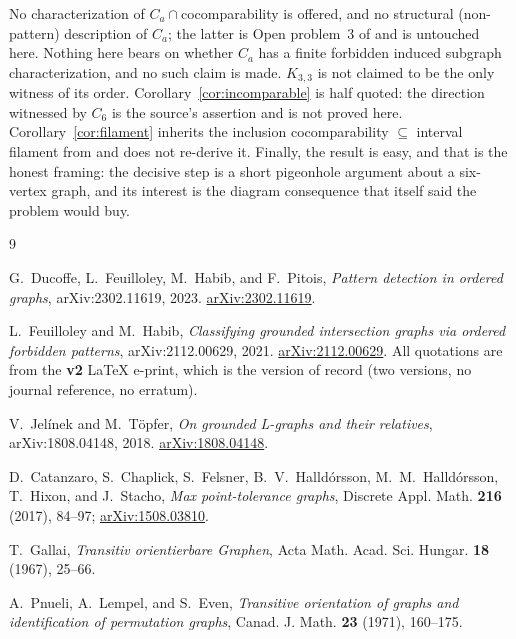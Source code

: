 \documentclass[11pt]{amsart}
\theoremstyle{remark}
\newcommand{\Ca}{C_a}
\begin{document}
No characterization of $\Ca\cap{}$cocomparability is offered, and no structural
(non-pattern) description of $\Ca$; the latter is Open problem~3 of \cite{FH} and
is untouched here. Nothing here bears on whether $\Ca$ has a finite forbidden
induced subgraph characterization, and no such claim is made. $K_{3,3}$ is not
claimed to be the only witness of its order.
Corollary~\ref{cor:incomparable} is half quoted: the direction witnessed by $C_6$
is the source's assertion and is not proved here.
Corollary~\ref{cor:filament} inherits the inclusion cocomparability
${}\subseteq{}$ interval filament from \cite{FH} and does not re-derive it.
Finally, the result is easy, and that is the honest framing: the decisive step is a
short pigeonhole argument about a six-vertex graph, and its interest is the
diagram consequence that \cite{FH} itself said the problem would buy.

\begin{thebibliography}{9}

G.~Ducoffe, L.~Feuilloley, M.~Habib, and F.~Pitois,
\emph{Pattern detection in ordered graphs},
arXiv:2302.11619, 2023.
\href{https://arxiv.org/abs/2302.11619}{arXiv:2302.11619}.

L.~Feuilloley and M.~Habib,
\emph{Classifying grounded intersection graphs via ordered forbidden patterns},
arXiv:2112.00629, 2021.
\href{https://arxiv.org/abs/2112.00629}{arXiv:2112.00629}.
All quotations are from the \textbf{v2} \LaTeX{} e-print, which is the version of
record (two versions, no journal reference, no erratum).

V.~Jel\'inek and M.~T\"opfer,
\emph{On grounded L-graphs and their relatives},
arXiv:1808.04148, 2018.
\href{https://arxiv.org/abs/1808.04148}{arXiv:1808.04148}.

D.~Catanzaro, S.~Chaplick, S.~Felsner, B.~V.~Halld\'orsson, M.~M.~Halld\'orsson,
T.~Hixon, and J.~Stacho,
\emph{Max point-tolerance graphs},
Discrete Appl. Math. \textbf{216} (2017), 84--97;
\href{https://arxiv.org/abs/1508.03810}{arXiv:1508.03810}.

T.~Gallai,
\emph{Transitiv orientierbare Graphen},
Acta Math. Acad. Sci. Hungar. \textbf{18} (1967), 25--66.

A.~Pnueli, A.~Lempel, and S.~Even,
\emph{Transitive orientation of graphs and identification of permutation graphs},
Canad. J. Math. \textbf{23} (1971), 160--175.

\end{thebibliography}
\end{document}
